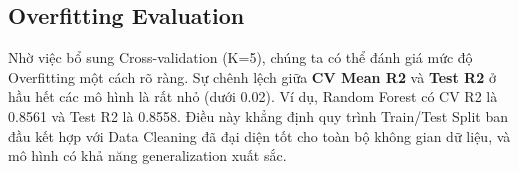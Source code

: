 \subsection{Overfitting Evaluation}
Nhờ việc bổ sung Cross-validation (K=5), chúng ta có thể đánh giá mức độ Overfitting một cách rõ ràng. Sự chênh lệch giữa \textbf{CV Mean R2} và \textbf{Test R2} ở hầu hết các mô hình là rất nhỏ (dưới 0.02). Ví dụ, Random Forest có CV R2 là 0.8561 và Test R2 là 0.8558. Điều này khẳng định quy trình Train/Test Split ban đầu kết hợp với Data Cleaning đã đại diện tốt cho toàn bộ không gian dữ liệu, và mô hình có khả năng generalization xuất sắc.
